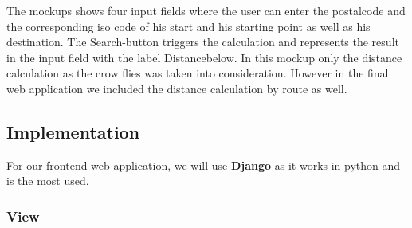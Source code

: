 The mockups shows four input fields where the user can enter the postalcode and the corresponding iso code of his start and his starting point as well as his destination. The \glqq Search\grqq-button triggers the calculation and represents the result in the input field with the label \glqq Distance\grqq below. In this mockup only the distance calculation as the crow flies was taken into consideration. However in the final web application we included the distance calculation by route as well.\\

\subsection{Implementation}

For our frontend web application, we will use \textbf{Django} as it works in python and is the most used.

\subsubsection{View}

